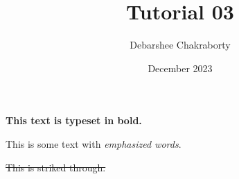 \documentclass{article}
\title{Tutorial 03}
\author{Debarshee Chakraborty}
\date{December 2023}
\begin{document}
\maketitle

\textbf{This text is typeset in bold.}

This is some text with \emph{emphasized words}.

\sout{This is striked through.}
\end{document}
